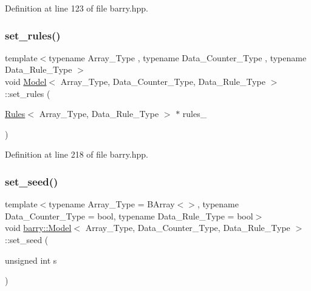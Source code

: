 Definition at line 123 of file barry.\+hpp.

\mbox{\label{classbarry_1_1_model_a86a46cf6fdc7c6514b97263f9ee4130b}} 
\subsubsection{\texorpdfstring{set\+\_\+rules()}{set\_rules()}}
{\footnotesize\ttfamily template$<$typename Array\+\_\+\+Type , typename Data\+\_\+\+Counter\+\_\+\+Type , typename Data\+\_\+\+Rule\+\_\+\+Type $>$ \\
void \hyperlink{classbarry_1_1_model}{Model}$<$ Array\+\_\+\+Type, Data\+\_\+\+Counter\+\_\+\+Type, Data\+\_\+\+Rule\+\_\+\+Type $>$\+::set\+\_\+rules (\begin{DoxyParamCaption}\item[{\hyperlink{classbarry_1_1_rules}{Rules}$<$ Array\+\_\+\+Type, Data\+\_\+\+Rule\+\_\+\+Type $>$ $\ast$}]{rules\+\_\+ }\end{DoxyParamCaption})\hspace{0.3cm}{\ttfamily [inline]}}



Definition at line 218 of file barry.\+hpp.

\mbox{\label{classbarry_1_1_model_a175a1772d843dedd603f6bb572cfa30a}} 
\subsubsection{\texorpdfstring{set\+\_\+seed()}{set\_seed()}}
{\footnotesize\ttfamily template$<$typename Array\+\_\+\+Type  = B\+Array$<$$>$, typename Data\+\_\+\+Counter\+\_\+\+Type  = bool, typename Data\+\_\+\+Rule\+\_\+\+Type  = bool$>$ \\
void \hyperlink{classbarry_1_1_model}{barry\+::\+Model}$<$ Array\+\_\+\+Type, Data\+\_\+\+Counter\+\_\+\+Type, Data\+\_\+\+Rule\+\_\+\+Type $>$\+::set\+\_\+seed (\begin{DoxyParamCaption}\item[{unsigned int}]{s }\end{DoxyParamCaption})\hspace{0.3cm}{\ttfamily [inline]}}



